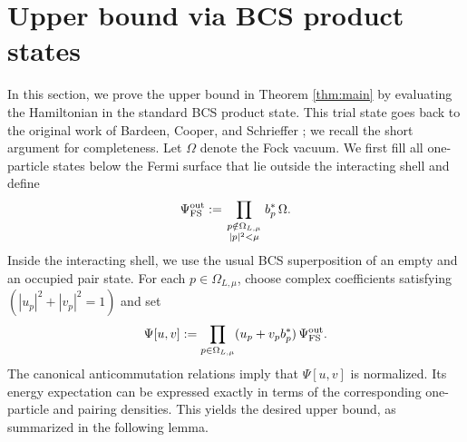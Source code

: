 \documentclass[11pt]{amsart}
\theoremstyle{definition}
\numberwithin{equation}{section}
\newcommand{\1}{\mathbf 1}
\begin{document}
\section{Upper bound via BCS product states}
\label{sec:upper}
In this section, we prove the upper bound in Theorem \ref{thm:main} by evaluating the Hamiltonian in the standard BCS product state. This trial state goes back to the original work of Bardeen, Cooper, and Schrieffer \cite{BCS1957}; we recall the short argument for completeness.
Let $\Omega$ denote the Fock vacuum. We first fill all one-particle states below the Fermi surface that lie outside the interacting shell and define
\begin{equation}\label{eq:FS-out}
 \Psi_{\rm FS}^{\rm out}
 :=
 \prod_{\substack{p\notin\Omega_{L,\mu}\atop |p|^2 < \mu}}
 b_p^*\,\Omega.
\end{equation}
Inside the interacting shell, we use the usual BCS superposition of an empty and an occupied pair state. For each $p \in \Omega_{L, \mu}$, choose complex coefficients satisfying $(|u_p|^2+|v_p|^2=1)$ and set
\begin{equation}\label{eq:BCS-product}
 \Psi[u,v]
 :=
 \prod_{p\in\Omega_{L,\mu}}
 (u_p+v_pb_p^*)\,\Psi_{\rm FS}^{\rm out}.
\end{equation}
The canonical anticommutation relations imply that $\Psi[u,v]$ is normalized. Its energy expectation can be expressed exactly in terms of the corresponding one-particle and pairing densities. This yields the desired upper bound, as summarized in the following lemma.
\end{document}
